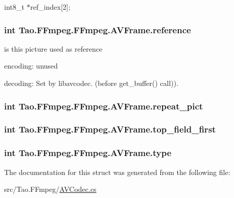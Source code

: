 int8\_\-t $\ast$ref\_\-index\mbox{[}2\mbox{]}; 

\hypertarget{struct_tao_1_1_f_fmpeg_1_1_f_fmpeg_1_1_a_v_frame_a1860efaee2f1c6f5efab3135d82668ab}{
\subsubsection[{reference}]{\setlength{\rightskip}{0pt plus 5cm}int {\bf Tao.FFmpeg.FFmpeg.AVFrame.reference}}}
\label{struct_tao_1_1_f_fmpeg_1_1_f_fmpeg_1_1_a_v_frame_a1860efaee2f1c6f5efab3135d82668ab}
is this picture used as reference
\begin{DoxyItemize}
\item encoding: unused
\item decoding: Set by libavcodec. (before get\_\-buffer() call)). 
\end{DoxyItemize}\hypertarget{struct_tao_1_1_f_fmpeg_1_1_f_fmpeg_1_1_a_v_frame_ab94c25f63dd99b267738a1e48ebfdbc8}{
\subsubsection[{repeat\_\-pict}]{\setlength{\rightskip}{0pt plus 5cm}int {\bf Tao.FFmpeg.FFmpeg.AVFrame.repeat\_\-pict}}}
\label{struct_tao_1_1_f_fmpeg_1_1_f_fmpeg_1_1_a_v_frame_ab94c25f63dd99b267738a1e48ebfdbc8}
\hypertarget{struct_tao_1_1_f_fmpeg_1_1_f_fmpeg_1_1_a_v_frame_a1205dddaf9d624918517d93cef82aed0}{
\subsubsection[{top\_\-field\_\-first}]{\setlength{\rightskip}{0pt plus 5cm}int {\bf Tao.FFmpeg.FFmpeg.AVFrame.top\_\-field\_\-first}}}
\label{struct_tao_1_1_f_fmpeg_1_1_f_fmpeg_1_1_a_v_frame_a1205dddaf9d624918517d93cef82aed0}
\hypertarget{struct_tao_1_1_f_fmpeg_1_1_f_fmpeg_1_1_a_v_frame_a4ecb65b3e9f921061be282b29c450bc1}{
\subsubsection[{type}]{\setlength{\rightskip}{0pt plus 5cm}int {\bf Tao.FFmpeg.FFmpeg.AVFrame.type}}}
\label{struct_tao_1_1_f_fmpeg_1_1_f_fmpeg_1_1_a_v_frame_a4ecb65b3e9f921061be282b29c450bc1}


The documentation for this struct was generated from the following file:\begin{DoxyCompactItemize}
\item 
src/Tao.FFmpeg/\hyperlink{_a_v_codec_8cs}{AVCodec.cs}\end{DoxyCompactItemize}
